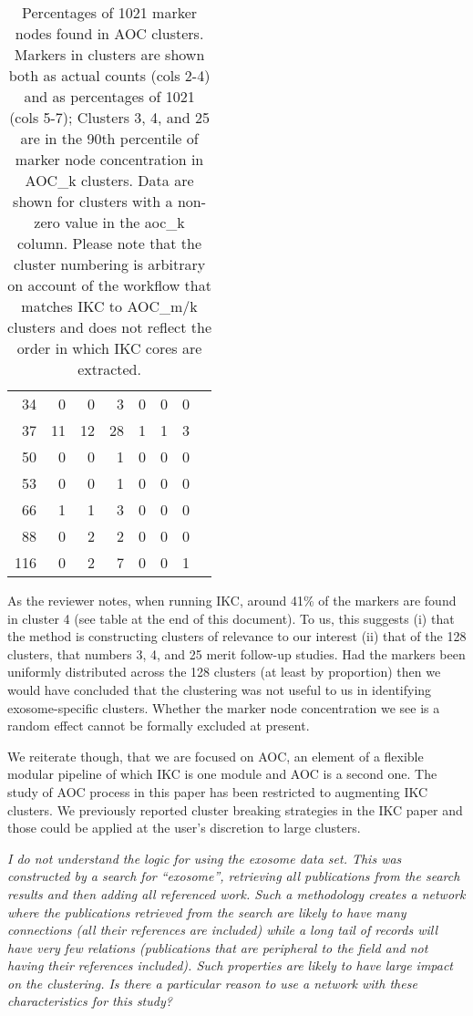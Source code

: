 \documentclass[11pt, oneside]{article}   	%
\begin{document}
\begin{table}[ht]
\begin{tabular}{rrrrrrrr}
34 & 0 &   0 &   3 &   0 &   0 &   0 \\ 
37 & 11 &  12 &  28 &   1 &   1 &   3 \\ 
50 & 0 &   0 &   1 &   0 &   0 &   0 \\ 
53 & 0 &   0 &   1 &   0 &   0 &   0 \\ 
66 & 1 &   1 &   3 &   0 &   0 &   0 \\ 
88 & 0 &   2 &   2 &   0 &   0 &   0 \\ 
116 & 0 &  2 &   7 &   0 &   0 &   1 \\ 
   \hline
\end{tabular}
\caption{Percentages of 1021 marker nodes found in AOC clusters. Markers in clusters are shown both as actual counts (cols 2-4) and as percentages of 1021 (cols 5-7); Clusters 3, 4, and 25 are in the 90th percentile of marker node concentration in AOC\_k clusters. Data are shown for clusters with a non-zero value in the aoc\_k column. Please note that the cluster numbering is arbitrary on account of the workflow that matches IKC to AOC\_m/k clusters and does not reflect the order in which IKC cores are extracted. }
\end{table}

As the reviewer notes, when running IKC, around 41\% of the markers are found in cluster 4 (see table at the end of this document). To us, this suggests (i) that the method is constructing clusters of relevance to our interest
(ii) that of the 128 clusters, that numbers 3, 4, and 25 merit follow-up studies. Had the markers been uniformly distributed across the 128 clusters (at least by proportion) then we
would have concluded that the clustering was not useful to us in identifying exosome-specific clusters. Whether the marker node concentration we see is a random effect cannot be formally excluded at present.

We reiterate though, that we are focused on AOC, an element of a flexible modular pipeline of which IKC is one module and AOC is a second one. The study of AOC process in this paper has been restricted 
to augmenting IKC clusters. We previously reported cluster breaking strategies in the IKC paper and those could be applied at the user's discretion to large clusters.

\emph{I do not understand the logic for using the exosome data set. This was constructed by a search for “exosome”, retrieving all publications from the search results and then adding all referenced work. Such a methodology creates a network where the publications retrieved from the search are likely to have many connections (all their references are included) while a long tail of records will have very few relations (publications that are peripheral to the field and not having their references included). Such properties are likely to have large impact on the clustering. Is there a particular reason to use a network with these characteristics for this study?}
\end{document}

